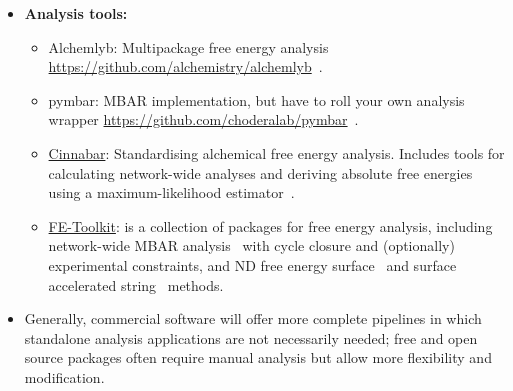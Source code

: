 \documentclass[9pt,bestpractices]{livecoms}
\begin{document}
\begin{itemize}
\begin{itemize}
	\item \href{http://pmx.mpibpc.mpg.de/instructions.html}{PMX}: Setup of perturbation maps, perturbed topologies and input coordinates for GROMACS simulations at \url{https://github.com/deGrootLab/pmx}.
	\item \href{https://github.com/qusers/qligfep}{QligFEP} offers robust and fast setup of FEP calculations for the software package Q~\cite{jespers2019qligfep}.
    \item \href{http://www.ties-service.org}{TIES} setting up, running, and analyzing alchemical free energy simulations using NAMD and OpenMM \url{https://github.com/UCL-CCS/TIES_MD}~\cite{bieniek2023}.
    \href{https://github.com/cbc-univie/transformato}{transformato} is a package for setting up single topology alchemical transformations to be run using CHARMM or OpenMM~\cite{karwounopoulos2022relative, karwounopoulos2023calculations, wieder2022alchemical}.
	\end{itemize}
\item []\textbf{Analysis tools:}
	\begin{itemize}

	\item Alchemlyb: Multipackage free energy analysis
	\url{https://github.com/alchemistry/alchemlyb}~\cite{daviddotson2020alchemistry}.
	\item pymbar: MBAR implementation, but have to roll your own analysis wrapper      
	\url{https://github.com/choderalab/pymbar}~\cite{shirts2008statisticallya}.
	\item \href{https://github.com/OpenFreeEnergy/cinnabar}{Cinnabar}: Standardising alchemical free energy analysis. Includes tools for calculating network-wide analyses and deriving absolute free energies using a maximum-likelihood estimator~\cite{richard_gowers_2025_15678719}.
    \item \href{https://gitlab.com/RutgersLBSR/fe-toolkit}{FE-Toolkit}: is a collection of packages for free energy analysis, including network-wide MBAR analysis~\cite{giese2025fe} with cycle closure and (optionally) experimental constraints, and ND free energy surface~\cite{Giese_JPhysChemA_2021_v125_p4216} and surface accelerated string~\cite{Giese_JChemTheoryComput_2024_v20_p2058} methods.
	\end{itemize}
\item[] Generally, commercial software will offer more complete pipelines in which standalone analysis applications are not necessarily needed; free and open source packages often require manual analysis but allow more flexibility and modification.
\end{itemize}
\end{document}
